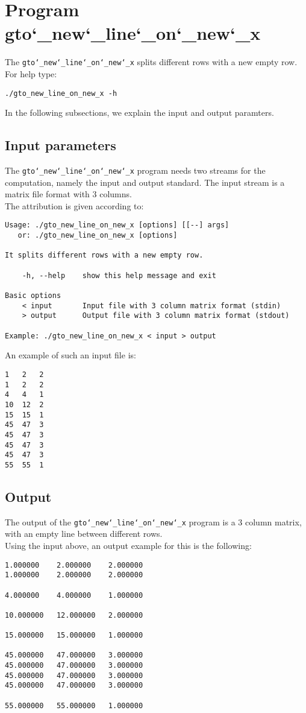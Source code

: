 \section{Program gto\char`_new\char`_line\char`_on\char`_new\char`_x}
The \texttt{gto\char`_new\char`_line\char`_on\char`_new\char`_x} splits different rows with a new empty row.\\
For help type:
\begin{lstlisting}
./gto_new_line_on_new_x -h
\end{lstlisting}
In the following subsections, we explain the input and output paramters.

\subsection*{Input parameters}

The \texttt{gto\char`_new\char`_line\char`_on\char`_new\char`_x} program needs two streams for the computation, namely the input and output standard. The input stream is a matrix file format with 3 columns.\\
The attribution is given according to:
\begin{lstlisting}
Usage: ./gto_new_line_on_new_x [options] [[--] args]
   or: ./gto_new_line_on_new_x [options]

It splits different rows with a new empty row.

    -h, --help    show this help message and exit

Basic options
    < input       Input file with 3 column matrix format (stdin)
    > output      Output file with 3 column matrix format (stdout)

Example: ./gto_new_line_on_new_x < input > output
\end{lstlisting}
An example of such an input file is:
\begin{lstlisting}
1	2	2
1	2	2
4	4	1
10	12	2
15	15	1
45	47	3
45	47	3
45	47	3
45	47	3
55	55	1
\end{lstlisting}

\subsection*{Output}
The output of the \texttt{gto\char`_new\char`_line\char`_on\char`_new\char`_x} program is a 3 column matrix, with an empty line between different rows.\\
Using the input above, an output example for this is the following:
\begin{lstlisting}
1.000000	2.000000	2.000000
1.000000	2.000000	2.000000

4.000000	4.000000	1.000000

10.000000	12.000000	2.000000

15.000000	15.000000	1.000000

45.000000	47.000000	3.000000
45.000000	47.000000	3.000000
45.000000	47.000000	3.000000
45.000000	47.000000	3.000000

55.000000	55.000000	1.000000
\end{lstlisting}
